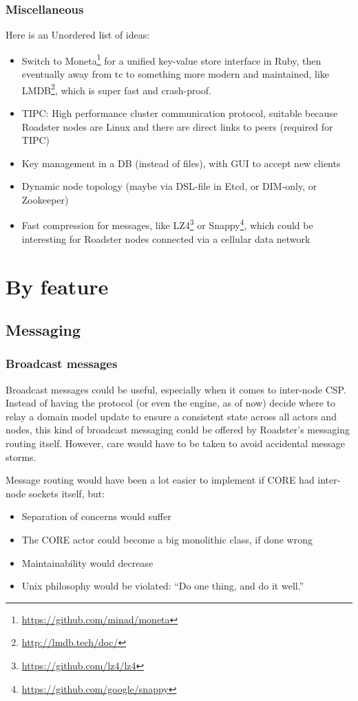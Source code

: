 \subsubsection{Miscellaneous}
Here is an Unordered list of ideas:
\begin{itemize}
	\item Switch to Moneta\footnote{\url{https://github.com/minad/moneta}} for a unified key-value store interface in Ruby, then eventually away from \gls{tc} to something more modern and maintained, like LMDB\footnote{\url{http://lmdb.tech/doc/}}, which is super fast and crash-proof.
	\item TIPC: High performance cluster communication protocol, suitable because Roadster nodes are Linux and there are direct links to peers (required for TIPC)
	\item Key management in a DB (instead of files), with GUI to accept new clients
	\item Dynamic node topology (maybe via DSL-file in Etcd, or DIM-only, or Zookeeper)
	\item Fast compression for messages, like LZ4\footnote{\url{https://github.com/lz4/lz4}} or Snappy\footnote{\url{https://github.com/google/snappy}}, which could be interesting for Roadster nodes connected via a cellular data network
\end{itemize}



\section{By feature}

\subsection{Messaging}
\subsubsection{Broadcast messages}
Broadcast messages could be useful, especially when it comes to inter-node CSP.
Instead of having the protocol (or even the engine, as of now) decide where to
relay a domain model update to ensure a consistent state across all actors and
nodes, this kind of broadcast messaging could be offered by Roadster's
messaging routing itself. However, care would have to be taken to avoid
accidental message storms.

Message routing would have been a lot easier to implement if CORE had inter-node sockets itself, but:
\begin{itemize}
	\item Separation of concerns would suffer
	\item The CORE actor could become a big monolithic class, if done wrong
	\item Maintainability would decrease
	\item Unix philosophy would be violated: ``Do one thing, and do it well.''
\end{itemize}


